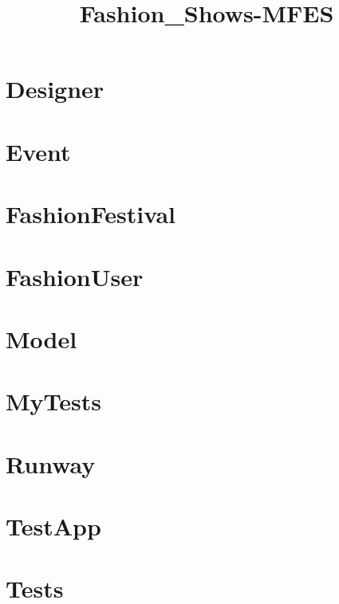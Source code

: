 \documentclass{article}
\begin{document}
\title{Fashion\_Shows-MFES}
\author{}
\maketitle
\tableofcontents

\section{Designer}

\section{Event}

\section{FashionFestival}

\section{FashionUser}

\section{Model}

\section{MyTests}

\section{Runway}

\section{TestApp}

\section{Tests}

\end{document}
